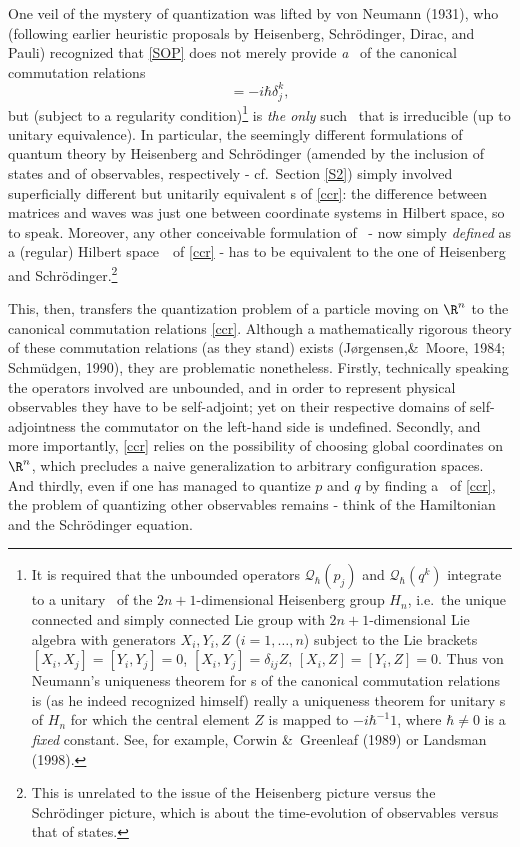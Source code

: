 \documentclass[12pt,titlepage]{article}
\newcommand{\beq}{\begin{equation}}
\newcommand{\eeq}{\end{equation}}
\newcommand{\Hs}{Hilbert space} \newcommand{\Bs}{Banach space}
\newcommand{\qh}{q_{\hbar}} \newcommand{\sgh}{\sigma_{\hbar}}
\newcommand{\inv}{^{-1}} \newcommand{\sa}{_{\R}}
\newcommand{\er}{\eqref}
\newcommand{\dl}{\delta} \newcommand{\Dl}{\Delta}
\newcommand{\CQ}{{\mathcal Q}} \newcommand{\CR}{{\mathcal R}}
\renewcommand{\qh}{\CQ_{\hbar}}
\begin{document}
One veil of the mystery of quantization was lifted by von Neumann (1931), who  (following earlier heuristic proposals by Heisenberg, Schr\"{o}dinger, Dirac, and Pauli) recognized that \er{SOP} does not  merely provide {\it a} \rep\ of the canonical commutation relations
\beq [\qh(p_j),\qh(q^k)]=-i\hbar\dl^k_j, \label{ccr}\eeq
but (subject to a regularity condition)\footnote{It is required that the unbounded operators $\qh(p_j)$ and $\qh(q^k)$ integrate to a unitary \rep\ of the $2n+1$-dimensional Heisenberg group $H_n$, i.e.\ the unique connected and simply connected Lie group with $2n+1$-dimensional Lie algebra with generators $X_i,Y_i,Z$ ($i=1,\ldots, n$)  subject to the Lie brackets $[X_i,X_j]=[Y_i,Y_j]=0$,
$[X_i,Y_j]=\dl_{ij}Z$, $[X_i,Z]=[Y_i,Z]=0$. Thus von Neumann's uniqueness theorem for \rep s of the canonical commutation relations is (as he indeed recognized himself) really a uniqueness theorem for unitary \rep s of $H_n$ for which the central element $Z$ is mapped to $-i\hbar\inv 1$, where $\hbar\neq 0$ is a {\it fixed} constant. See, for example, Corwin \&\ Greenleaf (1989) or Landsman (1998).} is {\it the only} such \rep\ that is irreducible (up to unitary equivalence). In particular, the seemingly different formulations of quantum theory by Heisenberg and Schr\"{o}dinger (amended by the inclusion of states and of observables, respectively - cf.\ Section \ref{S2}) simply involved superficially different but unitarily equivalent \rep s of \er{ccr}: the difference between matrices and waves was just one between coordinate systems in \Hs, so to speak.  Moreover, any other conceivable formulation of \qm\ - now simply {\it defined} as a (regular) \Hs\ \rep\ of \er{ccr} - has to be equivalent to the one of Heisenberg and Schr\"{o}dinger.\footnote{This is unrelated to the issue of the  Heisenberg picture versus the Schr\"{o}dinger picture, which is about the time-evolution of observables versus that of states.}

This, then, transfers the quantization problem of a particle moving on $\R^n$ to the canonical commutation relations \er{ccr}. Although a mathematically rigorous theory of these commutation relations (as they stand) exists (J\o rgensen,\&\ Moore, 1984; Schm\"{u}dgen, 1990), they are problematic nonetheless. Firstly, technically speaking the operators involved are unbounded, and in order to represent physical observables they have to be self-adjoint; yet on their respective domains of self-adjointness the commutator on the left-hand side is undefined. Secondly, and more importantly, \er{ccr} relies on the possibility of choosing  global coordinates on $\R^n$, which precludes  a naive generalization to arbitrary configuration spaces. And thirdly, even if one has managed to quantize $p$ and $q$ by finding a \rep\ of \er{ccr}, the problem of quantizing other observables remains - think of the Hamiltonian and the Schr\"{o}dinger equation.  
\end{document}

